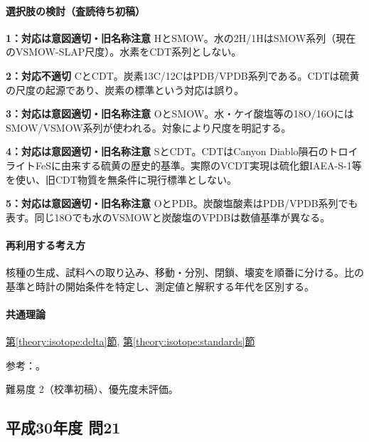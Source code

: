 \paragraph{選択肢の検討（査読待ち初稿）}\mbox{}\par

\noindent\textbf{1：対応は意図適切・旧名称注意} HとSMOW。水の2H/1HはSMOW系列（現在のVSMOW-SLAP尺度）。水素をCDT系列としない。\par

\noindent\textbf{2：対応不適切} CとCDT。炭素13C/12CはPDB/VPDB系列である。CDTは硫黄の尺度の起源であり、炭素の標準という対応は誤り。\par

\noindent\textbf{3：対応は意図適切・旧名称注意} OとSMOW。水・ケイ酸塩等の18O/16OにはSMOW/VSMOW系列が使われる。対象により尺度を明記する。\par

\noindent\textbf{4：対応は意図適切・旧名称注意} SとCDT。CDTはCanyon Diablo隕石のトロイライトFeSに由来する硫黄の歴史的基準。実際のVCDT実現は硫化銀IAEA-S-1等を使い、旧CDT物質を無条件に現行標準としない。\par

\noindent\textbf{5：対応は意図適切・旧名称注意} OとPDB。炭酸塩酸素はPDB/VPDB系列でも表す。同じ18Oでも水のVSMOWと炭酸塩のVPDBは数値基準が異なる。\par

\paragraph{再利用する考え方} 核種の生成、試料への取り込み、移動・分別、閉鎖、壊変を順番に分ける。比の基準と時計の開始条件を特定し、測定値と解釈する年代を区別する。

\paragraph{共通理論} \hyperref[theory:isotope:delta]{第\ref*{theory:isotope:delta}節}, \hyperref[theory:isotope:standards]{第\ref*{theory:isotope:standards}節}

\par 参考：\cite{iso_standards1995,iso_vsmow2,iso_vcdt}。

\par 難易度 2（校準初稿）、優先度未評価。

\subsection{平成30年度 問21}
\label{q:h30-reg-applied-21}

